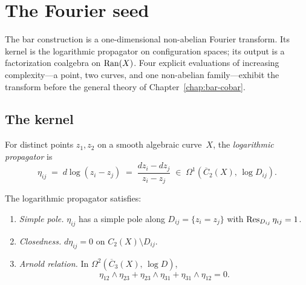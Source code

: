 \chapter{The Fourier seed}\label{ch:fourier-seed}



The bar construction is a one-dimensional non-abelian Fourier
transform.  Its kernel is the logarithmic propagator on
configuration spaces; its output is a factorization coalgebra on
$\operatorname{Ran}(X)$.  Four explicit evaluations of increasing
complexity---a point, two curves, and one non-abelian
family---exhibit the transform before the general theory of
Chapter~\ref{chap:bar-cobar}.

\section{The kernel}\label{sec:fourier-kernel}

\begin{definition}\label{def:fourier-log-propagator}
For distinct points $z_1, z_2$ on a smooth algebraic curve~$X$, the
\emph{logarithmic propagator} is
\begin{equation}\label{eq:fourier-log-propagator}
\eta_{ij} \;=\; d\log(z_i - z_j)
\;=\; \frac{dz_i - dz_j}{z_i - z_j}
\;\in\; \Omega^1(\overline{C}_2(X),\, \log D_{ij}).
\end{equation}
\end{definition}

\begin{proposition}
\label{prop:fourier-propagator-properties}
The logarithmic propagator satisfies:
\begin{enumerate}
\item \emph{Simple pole.}
  $\eta_{ij}$ has a simple pole along
  $D_{ij} = \{z_i = z_j\}$ with
  $\operatorname{Res}_{D_{ij}}\eta_{ij} = 1$.
\item \emph{Closedness.}
  $d\eta_{ij} = 0$ on $C_2(X) \setminus D_{ij}$.
\item \emph{Arnold relation.}
  In $\Omega^2(\overline{C}_3(X),\, \log D)$,
  \begin{equation}\label{eq:fourier-arnold}
  \eta_{12} \wedge \eta_{23}
  + \eta_{23} \wedge \eta_{31}
  + \eta_{31} \wedge \eta_{12} = 0.
  \end{equation}
\end{enumerate}
\end{proposition}

